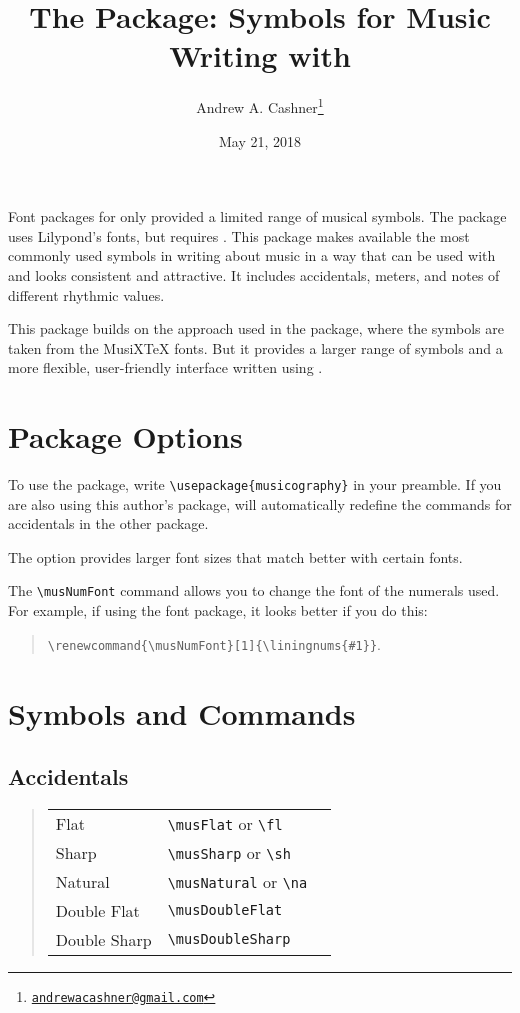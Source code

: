 \documentclass{article}
\title{The \code{musicography} Package: Symbols for Music Writing with
\code{pdflatex}}
\author{Andrew A. Cashner\thanks{%
    \href{mailto:andrewacashner@gmail.com}
    {\nolinkurl{andrewacashner@gmail.com}}%
    }%
}
\date{May 21, 2018}
\newenvironment{codetable}
{\begin{quote}\begin{tabular}{lll}}
{\end{tabular}\end{quote}}
\begin{document}
\maketitle

Font packages for  only provided a limited range of musical
symbols. 
The  package uses Lilypond's fonts, but requires
. 
This package makes available the most commonly used symbols in writing about
music in a way that can be used with  and looks consistent and
attractive.
It includes accidentals, meters, and notes of different rhythmic values.

This package builds on the approach used in the  package, where
the symbols are taken from the MusiXTeX fonts.
But it provides a larger range of symbols and a more flexible, user-friendly
interface written using .

\tableofcontents

\section{Package Options}

To use the package, write \verb|\usepackage{musicography}| in your preamble.
If you are also using this author's  package, 
 will automatically redefine the commands for accidentals in
the other package.

The  option provides larger font sizes that match better with
certain fonts.

The \verb|\musNumFont| command allows you to change the font of the numerals
used.
For example, if using the  font package, it looks better if you
do this: 
\begin{quote}
    \verb|\renewcommand{\musNumFont}[1]{\liningnums{#1}}|.
\end{quote}

\section{Symbols and Commands}

\subsection{Accidentals}

\begin{codetable}
    Flat & \verb|\musFlat| or \verb|\fl| & \musFlat\\
    Sharp & \verb|\musSharp| or \verb|\sh| & \musSharp\\
    Natural & \verb|\musNatural| or \verb|\na| & \musNatural\\
    Double Flat & \verb|\musDoubleFlat| & \musDoubleFlat\\
    Double Sharp & \verb|\musDoubleSharp| & \musDoubleSharp\\
\end{codetable}
\end{document}
